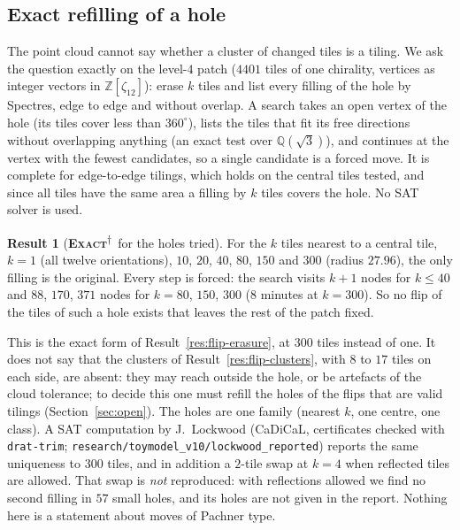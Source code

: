 \documentclass[11pt]{article}
\newcommand{\exact}{\textbf{\textsc{Exact}}}
\newcommand{\snap}{\textsuperscript{$\dagger$}}      %
\theoremstyle{definition}
\newtheorem{result}{Result}
\begin{document}
\subsection{Exact refilling of a hole}\label{sec:flips-cavity}
The point cloud cannot say whether a cluster of changed tiles is a tiling. We ask the question exactly on the level-$4$ patch ($4401$ tiles of one chirality, vertices as integer vectors in $\mathbb{Z}[\zeta_{12}]$): erase $k$ tiles and list every filling of the hole by Spectres, edge to edge and without overlap. A search takes an open vertex of the hole (its tiles cover less than $360^\circ$), lists the tiles that fit its free directions without overlapping anything (an exact test over $\mathbb{Q}(\sqrt3)$), and continues at the vertex with the fewest candidates, so a single candidate is a forced move. It is complete for edge-to-edge tilings, which holds on the central tiles tested, and since all tiles have the same area a filling by $k$ tiles covers the hole. No SAT solver is used.
\begin{result}[\exact\snap\ for the holes tried]\label{res:flip-cavity}
For the $k$ tiles nearest to a central tile, $k=1$ (all twelve orientations), $10$, $20$, $40$, $80$, $150$ and $300$ (radius $27.96$), the only filling is the original. Every step is forced: the search visits $k+1$ nodes for $k\le40$ and $88$, $170$, $371$ nodes for $k=80$, $150$, $300$ ($8$ minutes at $k=300$). So no flip of the tiles of such a hole exists that leaves the rest of the patch fixed.
\end{result}
This is the exact form of Result~\ref{res:flip-erasure}, at $300$ tiles instead of one. It does not say that the clusters of Result~\ref{res:flip-clusters}, with $8$ to $17$ tiles on each side, are absent: they may reach outside the hole, or be artefacts of the cloud tolerance; to decide this one must refill the holes of the flips that are valid tilings (Section~\ref{sec:open}). The holes are one family (nearest $k$, one centre, one class). A SAT computation by J.~Lockwood (CaDiCaL, certificates checked with \texttt{drat-trim}; \texttt{research/toymodel\_v10/lockwood\_reported}) reports the same uniqueness to $300$ tiles, and in addition a $2$-tile swap at $k=4$ when reflected tiles are allowed. That swap is \emph{not} reproduced: with reflections allowed we find no second filling in $57$ small holes, and its holes are not given in the report. Nothing here is a statement about moves of Pachner type.
\end{document}

